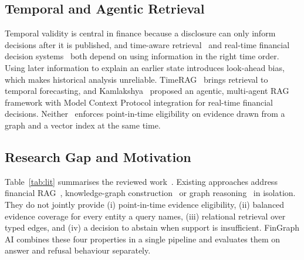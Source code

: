 \documentclass[conference]{IEEEtran}
\begin{document}
\subsection{Temporal and Agentic Retrieval}
Temporal validity is central in finance because a disclosure can only inform decisions after it is published, and time-aware retrieval~\cite{yang2025timerag} and real-time financial decision systems~\cite{kamlakshya2025agentic} both depend on using information in the right time order. Using later information to explain an earlier state introduces look-ahead bias, which makes historical analysis unreliable. TimeRAG~\cite{yang2025timerag} brings retrieval to temporal forecasting, and Kamlakshya~\cite{kamlakshya2025agentic} proposed an agentic, multi-agent RAG framework with Model Context Protocol integration for real-time financial decisions. Neither~\cite{yang2025timerag,kamlakshya2025agentic} enforces point-in-time eligibility on evidence drawn from a graph and a vector index at the same time.

\subsection{Research Gap and Motivation}
Table~\ref{tab:lit} summarises the reviewed work~\cite{ertugrul2026rag,yahathugoda2026kgatfin,yarlagadda2026kg,jain2025dynamic,chai2026graphllm,van2026llmstock,yang2025timerag,icocics2025earnings,sabuncuoglu2025bias,kamlakshya2025agentic}. Existing approaches address financial RAG~\cite{ertugrul2026rag,kamlakshya2025agentic}, knowledge-graph construction~\cite{yahathugoda2026kgatfin,yarlagadda2026kg,jain2025dynamic} or graph reasoning~\cite{chai2026graphllm} in isolation. They do not jointly provide (i) point-in-time evidence eligibility, (ii) balanced evidence coverage for every entity a query names, (iii) relational retrieval over typed edges, and (iv) a decision to abstain when support is insufficient. FinGraph AI combines these four properties in a single pipeline and evaluates them on answer and refusal behaviour separately.
\end{document}
